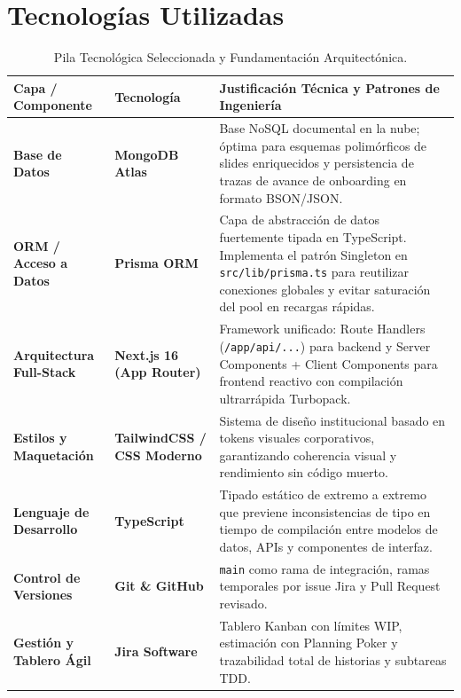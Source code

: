 \documentclass[11pt,a4paper]{article}
\begin{document}
\section{Tecnologías Utilizadas}
\begin{table}[H]
\centering
\scriptsize
\renewcommand{\arraystretch}{1.2}
\begin{tabularx}{\linewidth}{|>{\raggedright\arraybackslash}p{3.2cm}|>{\raggedright\arraybackslash}p{3.4cm}|>{\raggedright\arraybackslash}X|}
\hline
\rowcolor{gray!15}
\textbf{Capa / Componente} & \textbf{Tecnología} & \textbf{Justificación Técnica y Patrones de Ingeniería} \\
\hline
\textbf{Base de Datos} & \textbf{MongoDB Atlas} & Base NoSQL documental en la nube; óptima para esquemas polimórficos de slides enriquecidos y persistencia de trazas de avance de onboarding en formato BSON/JSON. \\
\hline
\textbf{ORM / Acceso a Datos} & \textbf{Prisma ORM} & Capa de abstracción de datos fuertemente tipada en TypeScript. Implementa el patrón Singleton en \texttt{src/lib/prisma.ts} para reutilizar conexiones globales y evitar saturación del pool en recargas rápidas. \\
\hline
\textbf{Arquitectura Full-Stack} & \textbf{Next.js 16 (App Router)} & Framework unificado: Route Handlers (\texttt{/app/api/...}) para backend y Server Components + Client Components para frontend reactivo con compilación ultrarrápida Turbopack. \\
\hline
\textbf{Estilos y Maquetación} & \textbf{TailwindCSS / CSS Moderno} & Sistema de diseño institucional basado en tokens visuales corporativos, garantizando coherencia visual y rendimiento sin código muerto. \\
\hline
\textbf{Lenguaje de Desarrollo} & \textbf{TypeScript} & Tipado estático de extremo a extremo que previene inconsistencias de tipo en tiempo de compilación entre modelos de datos, APIs y componentes de interfaz. \\
\hline
\textbf{Control de Versiones} & \textbf{Git \& GitHub} & \texttt{main} como rama de integración, ramas temporales por issue Jira y Pull Request revisado. \\
\hline
\textbf{Gestión y Tablero Ágil} & \textbf{Jira Software} & Tablero Kanban con límites WIP, estimación con Planning Poker \cite{cohn2004} y trazabilidad total de historias y subtareas TDD. \\
\hline
\end{tabularx}
\caption{Pila Tecnológica Seleccionada y Fundamentación Arquitectónica.}
\end{table}
\end{document}
